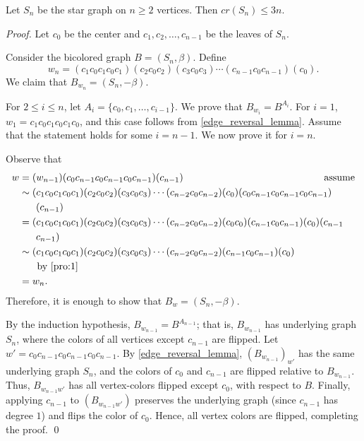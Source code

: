 \documentclass[runningheads,orivec]{llncs}
\begin{document}
\begin{theorem}\label{star}
    Let $S_n$ be the star graph on $n \geq 2$ vertices. Then $cr(S_n) \leq 3n$.
\end{theorem}
\begin{proof}
    Let $c_0$ be the center and $c_1, c_2, \ldots, c_{n-1}$ be the leaves of $S_n$. 
    
    Consider the bicolored graph $B = (S_n, \beta)$. Define
    \[
        w_n = (c_1c_0c_1c_0c_1)(c_2c_0c_2)(c_3c_0c_3)\cdots(c_{n-1}c_0c_{n-1})(c_0).
    \]
    We claim that $B_{w_n} = (S_n, -\beta)$.

    For $2 \leq i \leq n$, let $A_i = \{c_0, c_1, \ldots, c_{i-1}\}$. We prove that $B_{w_i} = B^{A_i}$.
    For $i=1$, $w_1 = c_1c_0c_1c_0c_1c_0$, and this case follows from \autoref{edge_reversal_lemma}.  
    Assume that the statement holds for some $i = n-1$. We now prove it for $i = n$.

    Observe that
    \begin{align*}
        w 
            &= (w_{n-1})(c_0c_{n-1}c_0c_{n-1}c_0c_{n-1})(c_{n-1}) \hspace{5 cm}  \text{assume}\\ 
            &\sim (c_1c_0c_1c_0c_1)(c_2c_0c_2)(c_3c_0c_3)\cdots(c_{n-2}c_0c_{n-2})(c_0)
                    (c_0c_{n-1}c_0c_{n-1}c_0c_{n-1})\\ & \hspace{17pt}(c_{n-1}) \\
            &= (c_1c_0c_1c_0c_1)(c_2c_0c_2)(c_3c_0c_3)\cdots(c_{n-2}c_0c_{n-2})(c_0c_0)
                    (c_{n-1}c_0c_{n-1})(c_0)(c_{n-1}\\ & \hspace{17pt}c_{n-1}) \\
            &\sim (c_1c_0c_1c_0c_1)(c_2c_0c_2)(c_3c_0c_3)\cdots(c_{n-2}c_0c_{n-2})(c_{n-1}c_0c_{n-1})(c_0)\\
                  & \hspace{17pt}  \hspace{1pt} \text{by \autoref{pro:1}} \\
            &= w_n.  
    \end{align*}
    Therefore, it is enough to show that $B_w = (S_n, -\beta)$. 

    By the induction hypothesis, $B_{w_{n-1}} = B^{A_{n-1}}$; that is, $B_{w_{n-1}}$ has underlying graph $S_n$, where the colors of all vertices except $c_{n-1}$ are flipped.  
    Let $w' = c_0c_{n-1}c_0c_{n-1}c_0c_{n-1}$. By \autoref{edge_reversal_lemma}, $(B_{w_{n-1}})_{w'}$ has the same underlying graph $S_n$, and the colors of $c_0$ and $c_{n-1}$ are flipped relative to $B_{w_{n-1}}$.  
    Thus, $B_{w_{n-1}w'}$ has all vertex-colors flipped except $c_0$, with respect to $B$. Finally, applying $c_{n-1}$ to $(B_{w_{n-1}w'})$ preserves the underlying graph (since $c_{n-1}$ has degree $1$) and flips the color of $c_0$. Hence, all vertex colors are flipped, completing the proof.
    \qed
\end{proof}
\end{document}
